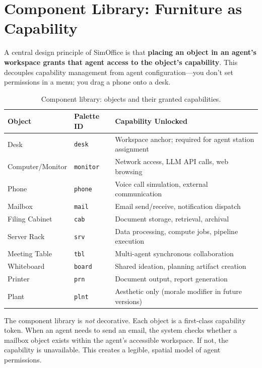 \documentclass[11pt,letterpaper]{article}
\begin{document}
\section{Component Library: Furniture as Capability}

A central design principle of SimOffice is that \textbf{placing an object in an agent's workspace grants that agent access to the object's capability}. This decouples capability management from agent configuration---you don't set permissions in a menu; you drag a phone onto a desk.

\begin{table}[H]
\centering
\small
\begin{tabularx}{\textwidth}{llX}
\toprule
\textbf{Object} & \textbf{Palette ID} & \textbf{Capability Unlocked} \\
\midrule
Desk              & \texttt{desk}    & Workspace anchor; required for agent station assignment \\
Computer/Monitor  & \texttt{monitor} & Network access, LLM API calls, web browsing \\
Phone             & \texttt{phone}   & Voice call simulation, external communication \\
Mailbox           & \texttt{mail}    & Email send/receive, notification dispatch \\
Filing Cabinet    & \texttt{cab}     & Document storage, retrieval, archival \\
Server Rack       & \texttt{srv}     & Data processing, compute jobs, pipeline execution \\
Meeting Table     & \texttt{tbl}     & Multi-agent synchronous collaboration \\
Whiteboard        & \texttt{board}   & Shared ideation, planning artifact creation \\
Printer           & \texttt{prn}     & Document output, report generation \\
Plant             & \texttt{plnt}    & Aesthetic only (morale modifier in future versions) \\
\bottomrule
\end{tabularx}
\caption{Component library: objects and their granted capabilities.}
\end{table}

\begin{designbox}
The component library is \emph{not} decorative. Each object is a first-class capability token. When an agent needs to send an email, the system checks whether a mailbox object exists within the agent's accessible workspace. If not, the capability is unavailable. This creates a legible, spatial model of agent permissions.
\end{designbox}
\end{document}
